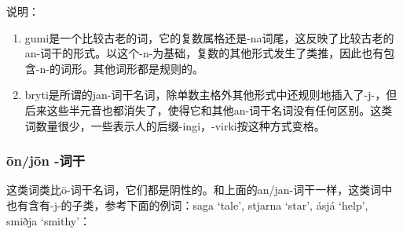 说明：

\begin{enumerate}
  \def\labelenumi{\arabic{enumi})}
  \item
        gumi是一个比较古老的词，它的复数属格还是-na词尾，这反映了比较古老的an-词干的形式。以这个-n-为基础，复数的其他形式发生了类推，因此也有包含-n-的词形。其他词形都是规则的。
  \item
        bryti是所谓的jan-词干名词，除单数主格外其他形式中还规则地插入了-j-，但后来这些半元音也都消失了，使得它和其他an-词干名词没有任何区别。这类词数量很少，一些表示人的后缀-ingi，-virki按这种方式变格。
\end{enumerate}

\subsubsection{ōn/jōn -词干}\label{ōn/jōn -词干}

这类词类比ō-词干名词，它们都是阴性的。和上面的an/jan-词干一样，这类词中也有含有-j-的子类，参考下面的例词：saga
`tale', stjarna `star', ásjá `help', smiðja `smithy'：

